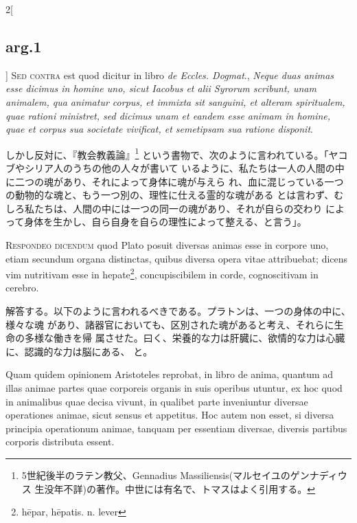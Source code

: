 \documentclass[paper=a4paper,fontsize=10pt,jafontsize=9pt,titlepage]{jlreq}
\begin{document}
\begin{paracol}{2}[\subsection{arg.1}]
{\scshape Sed contra} est quod dicitur in libro {\itshape de Eccles. Dogmat}.,
{\itshape Neque duas animas esse dicimus in homine uno, sicut Iacobus et alii
Syrorum scribunt, unam animalem, qua animatur corpus, et immixta sit sanguini,
et alteram spiritualem, quae rationi ministret, sed dicimus unam et eandem esse
animam in homine, quae et corpus sua societate vivificat, et semetipsam sua
ratione disponit}.

\switchcolumn

しかし反対に、『教会教義論』\footnote{5世紀後半のラテン教父、Gennadius
  Massiliensis(マルセイユのゲンナディウス 生没年不詳)の著作。中世には有名で、トマスはよく引用する。}
という書物で、次のように言われている。「ヤコブやシリア人のうちの他の人々が書いて
いるように、私たちは一人の人間の中に二つの魂があり、それによって身体に魂が与えら
れ、血に混じっている一つの動物的な魂と、もう一つ別の、理性に仕える霊的な魂がある
とは言わず、むしろ私たちは、人間の中には一つの同一の魂があり、それが自らの交わり
によって身体を生かし、自ら自身を自らの理性によって整える、と言う」。
 

{\scshape Respondeo dicendum} quod Plato posuit diversas animas esse in corpore
uno, etiam secundum organa distinctas, quibus diversa opera vitae attribuebat;
dicens vim nutritivam esse in hepate\footnote{h\={e}par, h\={e}patis. n. lever}, concupiscibilem in corde, cognoscitivam in cerebro.

\switchcolumn

解答する。以下のように言われるべきである。プラトンは、一つの身体の中に、様々な魂
があり、諸器官においても、区別された魂があると考え、それらに生命の多様な働きを帰
属させた。曰く、栄養的な力は肝臓に、欲情的な力は心臓に、認識的な力は脳にある、
と。
 
\switchcolumn*

Quam quidem opinionem Aristoteles reprobat, in libro de anima, quantum ad illas
animae partes quae corporeis organis in suis operibus utuntur, ex hoc quod in
animalibus quae decisa vivunt, in qualibet parte inveniuntur diversae
operationes animae, sicut sensus et appetitus. Hoc autem non esset, si diversa
principia operationum animae, tanquam per essentiam diversae, diversis partibus
corporis distributa essent.

\switchcolumn


\end{paracol}
\end{document}
